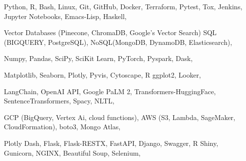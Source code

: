 


\begin{cvskills}


{
Python, R, Bash, Linux, Git, GitHub, Docker, Terraform, Pytest, Tox, Jenkins, Jupyter Notebooks, Emacs-Lisp, Haskell,
}

{
Vector Databases (Pinecone, ChromaDB, Google's Vector Search) SQL (BIGQUERY, PostgreSQL), NoSQL(MongoDB, DynamoDB, Elasticsearch),
}

{
Numpy, Pandas, SciPy, SciKit Learn, PyTorch, Pyspark, Dask,
}

{
Matplotlib, Seaborn, Plotly, Pyvis, Cytoscape, R ggplot2, Looker,
}

{
LangChain, OpenAI API, Google PaLM 2, Transformers-HuggingFace, SentenceTransformers, Spacy, NLTL, 
}

{
GCP (BigQuery, Vertex Ai, cloud functions), AWS (S3, Lambda, SageMaker, CloudFormation), boto3, Mongo Atlas,
}

{
Plotly Dash, Flask, Flask-RESTX, FastAPI, Django, Swagger, R Shiny, Gunicorn, NGINX, Beautiful Soup, Selenium,
}






\end{cvskills}
